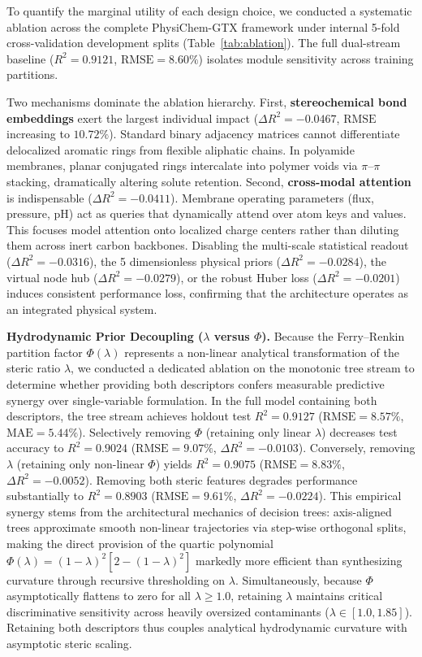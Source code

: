 \documentclass[10pt,twocolumn]{article}
\newcommand{\rsq}{R^{2}}
\begin{document}
To quantify the marginal utility of each design choice, we conducted a systematic ablation across the complete PhysiChem-GTX framework under internal 5-fold cross-validation development splits (Table~\ref{tab:ablation}). The full dual-stream baseline ($\rsq = 0.9121$, $\mathrm{RMSE} = 8.60\%$) isolates module sensitivity across training partitions.

Two mechanisms dominate the ablation hierarchy. First, \textbf{stereochemical bond embeddings} exert the largest individual impact ($\Delta \rsq = -0.0467$, $\mathrm{RMSE}$ increasing to $10.72\%$). Standard binary adjacency matrices cannot differentiate delocalized aromatic rings from flexible aliphatic chains. In polyamide membranes, planar conjugated rings intercalate into polymer voids via $\pi$--$\pi$ stacking, dramatically altering solute retention. Second, \textbf{cross-modal attention} is indispensable ($\Delta \rsq = -0.0411$). Membrane operating parameters (flux, pressure, pH) act as queries that dynamically attend over atom keys and values. This focuses model attention onto localized charge centers rather than diluting them across inert carbon backbones. Disabling the multi-scale statistical readout ($\Delta \rsq = -0.0316$), the 5 dimensionless physical priors ($\Delta \rsq = -0.0284$), the virtual node hub ($\Delta \rsq = -0.0279$), or the robust Huber loss ($\Delta \rsq = -0.0201$) induces consistent performance loss, confirming that the architecture operates as an integrated physical system.

\textbf{Hydrodynamic Prior Decoupling ($\lambda$ versus $\Phi$).} Because the Ferry--Renkin partition factor $\Phi(\lambda)$ represents a non-linear analytical transformation of the steric ratio $\lambda$, we conducted a dedicated ablation on the monotonic tree stream to determine whether providing both descriptors confers measurable predictive synergy over single-variable formulation. In the full model containing both descriptors, the tree stream achieves holdout test $\rsq = 0.9127$ ($\mathrm{RMSE} = 8.57\%$, $\mathrm{MAE} = 5.44\%$). Selectively removing $\Phi$ (retaining only linear $\lambda$) decreases test accuracy to $\rsq = 0.9024$ ($\mathrm{RMSE} = 9.07\%$, $\Delta \rsq = -0.0103$). Conversely, removing $\lambda$ (retaining only non-linear $\Phi$) yields $\rsq = 0.9075$ ($\mathrm{RMSE} = 8.83\%$, $\Delta \rsq = -0.0052$). Removing both steric features degrades performance substantially to $\rsq = 0.8903$ ($\mathrm{RMSE} = 9.61\%$, $\Delta \rsq = -0.0224$). This empirical synergy stems from the architectural mechanics of decision trees: axis-aligned trees approximate smooth non-linear trajectories via step-wise orthogonal splits, making the direct provision of the quartic polynomial $\Phi(\lambda) = (1-\lambda)^2[2-(1-\lambda)^2]$ markedly more efficient than synthesizing curvature through recursive thresholding on $\lambda$. Simultaneously, because $\Phi$ asymptotically flattens to zero for all $\lambda \geq 1.0$, retaining $\lambda$ maintains critical discriminative sensitivity across heavily oversized contaminants ($\lambda \in [1.0, 1.85]$). Retaining both descriptors thus couples analytical hydrodynamic curvature with asymptotic steric scaling.
\end{document}
